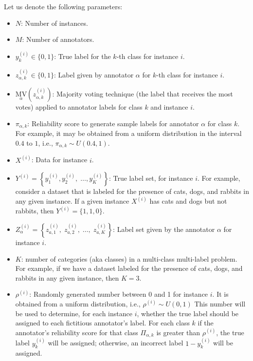 \documentclass[pdflatex,bst/sn-basic]{bst/sn-jnl}%
\begin{document}
Let us denote the following parameters:

\begin{itemize}
\renewcommand{\textbullet}{}
    \item  $N$: Number of instances.

    \item  $M$: Number of annotators.

    \item  $y_k^{(i)} \in \{0,1\} $: True label for the $k $-th class for instance $i $.

    \item  $z_{\alpha,k}^{(i)} \in \{0,1\} $: Label given by annotator $\alpha $ for $k $-th class for instance $i $.

    \item  ${{\underset\alpha{\mathrm{MV}}}{\left(z_{\alpha,k}^{(i)}\right)}} $: Majority voting technique (the label that receives the most votes) applied to annotator labels for class $k $ and instance $i $.

    \item  $\pi_{\alpha,k} $: Reliability score to generate sample labels for annotator $\alpha $ for class $k $. For example, it may be obtained from a uniform distribution in the interval $0.4 $ to $1 $, i.e., $\pi_{\alpha,k} \sim U(0.4,1) $.

    \item  $X^{(i)} $: Data for instance $i$.

    \item  $Y^{(i)}=\left\{y_1^{(i)},y_2^{(i)},\;\dots,y_{K}^{(i)}\right\} $: True label set, for instance $i $. For example, consider a dataset that is labeled for the presence of cats, dogs, and rabbits in any given instance. If a given instance $X^{(i)} $ has cats and dogs but not rabbits, then $Y^{(i)}=\{1,1,0\} $.

    \item  $Z_{\alpha}^{(i)}=\left\{z_{a,1}^{(i)},\;z_{a,2}^{(i)},\;\dots,\;z_{a,K}^{(i)}\right\} $: Label set given by the annotator $\alpha $ for instance $i $.

    \item $K$: number of categories (aka classes) in a multi-class multi-label problem. For example, if we have a dataset labeled for the presence of cats, dogs, and rabbits in any given instance, then $K=3$.

    \item  $\rho^{(i)}$: Randomly generated number  between 0 and 1 for instance $i $. It is obtained from a uniform distribution, i.e., $\rho^{(i)} \sim U(0,1) $ This number will be used to determine, for each instance $i$, whether the true label should be assigned to each fictitious annotator's label. For each class $k$ if the annotator's reliability score for that class ${\Pi}_{\alpha,k}$ is greater than $\rho^{(i)}$, the true label $y_k^{(i)}$ will be assigned; otherwise, an incorrect label $1 - y_k^{(i)}$  will be assigned.


\end{itemize}
\end{document}
